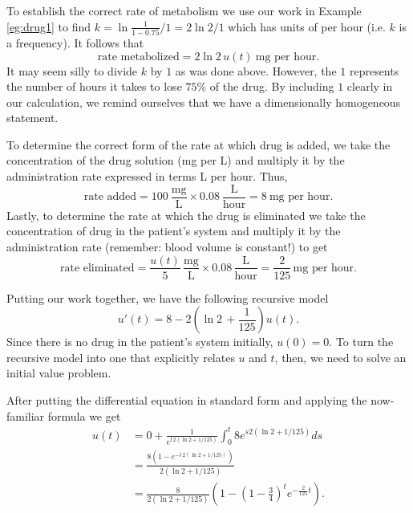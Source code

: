 \documentclass[../book.tex]{subfiles}
\begin{document}
\begin{solution}
To establish the correct rate of metabolism we use our work in Example \ref{eg:drug1} to find \(k=\ln \frac{1}{1-0.75} / 1 = 2\ln 2/1\) which has units of per hour (i.e. \(k\) is a frequency). It follows that
\begin{equation}\label{eq:de-32}
\text{rate metabolized} = 2\ln 2\, u(t) \ \text{mg per hour.} 
\end{equation}
It may seem silly to divide \(k\) by \(1\) as was done above. However, the \(1\) represents the number of hours it takes to lose \(75\%\) of the drug. By including \(1\) clearly in our calculation, we remind ourselves that we have a dimensionally homogeneous statement.

To determine the correct form of the rate at which drug is added, we take the concentration of the drug solution (mg per L) and multiply it by the administration rate expressed in terms L per hour. Thus,
\begin{equation}\label{eq:de-33}
\text{rate added} = 100\ \frac{\text{mg}}{\text{L}} \times 0.08\ \frac{\text{L}}{\text{hour}} = 8\ \text{mg per hour.} 
\end{equation}
Lastly, to determine the rate at which the drug is eliminated we take the concentration of drug in the patient's system and multiply it by the administration rate (remember: blood volume is constant!) to get
\begin{equation}\label{eq:de-34}
\text{rate eliminated} = \frac{u(t)}{5} \,\frac{\text{mg}}{\text{L}} \times 0.08 \, \frac{\text{L}}{\text{hour}} =  \frac{2}{125} \, \text{mg per hour.}
\end{equation}

Putting our work together, we have the following recursive model
\begin{equation}\label{eq:de-35}
u'(t) = 8  - 2 \left( \ln 2\, + \frac{1}{125} \right) u(t). 
\end{equation}
Since there is no drug in the patient's system initially, \(u(0)=0\). To turn the recursive model into one that explicitly relates \(u\) and \(t\), then, we need to solve an initial value problem.

After putting the differential equation in standard form and applying the now-familiar formula we get
\begin{equation}\label{eq:de-36}
\begin{aligned}
u(t) 
&= 0 + \frac{1}{e^{t\,2(\ln 2 + 1/125)}} \int_{0}^{t} 8 e^{s 2(\ln 2 + 1/125)} ds \\[3ex]
&= \frac{8\left( 1 - e^{-t\, 2(\ln 2 + 1/125)} \right)}{2(\ln 2 + 1/125)} \\[3ex]
&=\frac{8}{2(\ln 2 + 1/125)} \left( 1 - \left(1- \frac{3}{4} \right)^{t} e^{-\frac{2}{125}t} \right).
\end{aligned}
\end{equation}
\end{solution}
\end{document}
